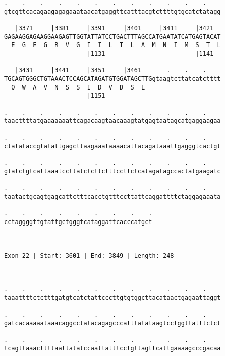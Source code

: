 \documentclass{article}
\begin{document}
\begin{Verbatim}
.    .    .    .    .    .    .    .    .    .    .    .    
gtcgttcacagaagagagaaataacatgaggttcatttacgtcttttgtgcatctatagg
                                                            
   |3371     |3381     |3391     |3401     |3411     |3421  
GAGAAGGAGAAGGAAGAGTTGGTATTATCCTGACTTTAGCCATGAATATCATGAGTACAT
  E  G  E  G  R  V  G  I  I  L  T  L  A  M  N  I  M  S  T  L
                       |1131                         |1141  
  
   |3431     |3441     |3451     |3461       .    .    .    
TGCAGTGGGCTGTAAACTCCAGCATAGATGTGGATAGCTTGgtaagtcttatcatctttt
  Q  W  A  V  N  S  S  I  D  V  D  S  L                     
                       |1151                                
  
.    .    .    .    .    .    .    .    .    .    .    .    
taacttttatgaaaaaaattcagacaagtaacaaagtatgagtaatagcatgaggaagaa
                                                            
.    .    .    .    .    .    .    .    .    .    .    .    
ctatataccgtatattgagcttaagaaataaaacattacagataaattgagggtcactgt
                                                            
.    .    .    .    .    .    .    .    .    .    .    .    
gtatctgtcattaaatccttatctcttctttccttctcatagatagccactatgaagatc
                                                            
.    .    .    .    .    .    .    .    .    .    .    .    
taatactgcagtgagcattctttcacctgtttccttattcaggattttctaggagaaata
                                                            
.    .    .    .    .    .    .    .    .
cctaggggttgtattgctgggtcataggattcacccatgct
                                         
                                         
 
Exon 22 | Start: 3601 | End: 3849 | Length: 248



.    .    .    .    .    .    .    .    .    .    .    .    
taaattttctctttgatgtcatctattcccttgtgtggcttacataactgagaattaggt
                                                            
.    .    .    .    .    .    .    .    .    .    .    .    
gatcacaaaaataaacaggcctatacagagcccatttatataagtcctggttatttctct
                                                            
.    .    .    .    .    .    .    .    .    .    .    .    
tcagttaaacttttaattatatccaattatttcctgttagttcattgaaaagcccgacaa
                                                            

\end{Verbatim}
\end{document}
